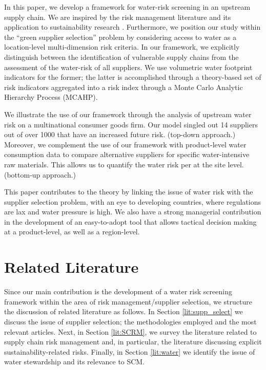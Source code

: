 \documentclass[a4paper]{article}
\begin{document}
In this paper, we develop a framework for water-risk screening in an upstream supply chain.
We are inspired by the risk management literature \citep{Sodhi:2012} and its application to sustainability research \citep{Giannakis:2016}. Furthermore, we position our study within the ``green supplier selection'' problem \citep{Appolloni:2014} by considering access to water as a location-level multi-dimension risk criteria. 
In our framework, we explicitly distinguish between the identification of vulnerable supply chains from the assessment of the water-risk of all suppliers. 
We use volumetric water footprint indicators for the former; the latter is accomplished through a theory-based set of risk indicators aggregated into a risk index through a Monte Carlo Analytic Hierarchy Process (MCAHP).

We illustrate the use of our framework through the analysis of upstream water risk on a multinational consumer goods firm. 
Our model singled out 14 suppliers out of over 1000 that have an increased future risk. 
(top-down approach.)
Moreover, we complement the use of our framework with product-level water consumption data to compare alternative suppliers for specific water-intensive raw materials. 
This allows us to quantify the water risk per at the site level.
(bottom-up approach.) 

This paper contributes to the theory by linking the issue of water risk with the supplier selection problem, with an eye to developing countries, where regulations are lax and water pressure is high. 
We also have a strong managerial contribution in the development of an easy-to-adopt tool that allows tactical decision making at a product-level, as well as a region-level. 

\section{Related Literature}
Since our main contribution is the development of a water risk screening framework within the area of risk management/supplier selection, we structure the discussion of related literature as follows.
In Section \ref{lit:supp_select} we discuss the issue of supplier selection; the methodologies employed and the most relevant articles. 
Next, in Section \ref{lit:SCRM}, we survey the literature related to supply chain risk management and, in particular, the literature discussing explicit sustainability-related risks. 
Finally, in Section \ref{lit:water} we identify the issue of water stewardship and its relevance to SCM.
\end{document}
